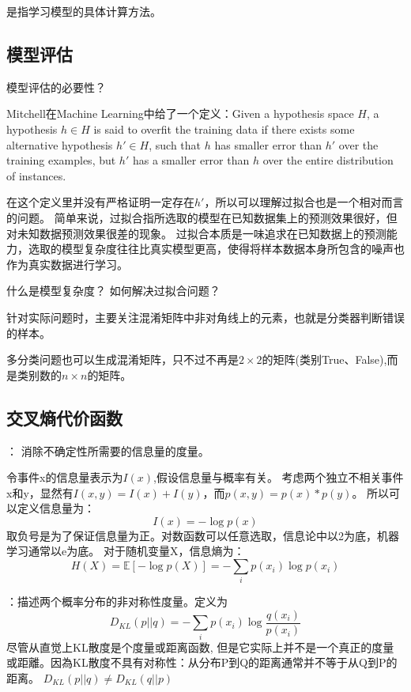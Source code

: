 {}是指学习模型的具体计算方法。


\subsection{模型评估}
模型评估的必要性？

{}

Mitchell在Machine Learning中给了一个定义：Given a hypothesis space $H$, a hypothesis $h \in H$ 
is said to overfit the training data if there exists some alternative hypothesis $h' \in H$,
such that $h$ has smaller error than $h'$ over the training examples, but $h'$ has a smaller
error than $h$ over the entire distribution of instances.

在这个定义里并没有严格证明一定存在$h'$，所以可以理解过拟合也是一个相对而言的问题。
简单来说，过拟合指所选取的模型在已知数据集上的预测效果很好，但对未知数据预测效果很差的现象。
过拟合本质是一味追求在已知数据上的预测能力，选取的模型复杂度往往比真实模型更高，使得将样本数据本身所包含的噪声也作为真实数据进行学习。

什么是模型复杂度？
如何解决过拟合问题？

{}

针对实际问题时，主要关注混淆矩阵中非对角线上的元素，也就是分类器判断错误的样本。

多分类问题也可以生成混淆矩阵，只不过不再是$2 \times 2$的矩阵(类别True、False),而是类别数的$n \times n$的矩阵。

{}

\subsection{交叉熵代价函数}
{}： 消除不确定性所需要的信息量的度量。

令事件x的信息量表示为$I(x)$,假设信息量与概率有关。
考虑两个独立不相关事件x和y，显然有$I(x,y) = I(x)+I(y)$，而$p(x,y)=p(x)*p(y)$。
所以可以定义信息量为：
\begin{equation*}
    I(x) = -\log p(x)
\end{equation*}
取负号是为了保证信息量为正。对数函数可以任意选取，信息论中以2为底，机器学习通常以e为底。
对于随机变量X，信息熵为：
\begin{equation*}
    H(X) = \mathbb{E}[-\log p(X)] = - \sum_i p(x_i) \log p(x_i)
\end{equation*}

{}：描述两个概率分布的非对称性度量。定义为
\begin{equation*}
    D_{KL}(p||q) = -\sum_i p(x_i) \log \frac{q(x_i)}{p(x_i)}
\end{equation*}
{\color{red}尽管从直觉上KL散度是个度量或距离函数, 但是它实际上并不是一个真正的度量或距離。因為KL散度不具有对称性：从分布P到Q的距离通常并不等于从Q到P的距离。
$D_{KL}(p||q) \neq D_{KL}(q||p)$} 

